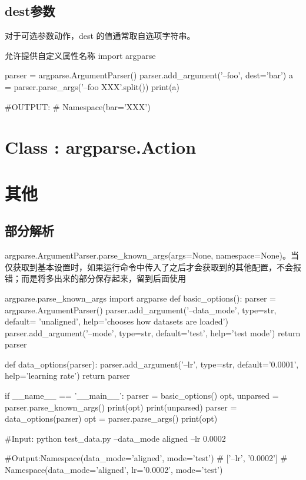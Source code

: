 \documentclass[11pt]{article}
\begin{document}
\subsection{dest参数}
对于可选参数动作，dest 的值通常取自选项字符串。
\begin{Python}{允许提供自定义属性名称}
import argparse

parser = argparse.ArgumentParser()
parser.add_argument('--foo', dest='bar')
a = parser.parse_args('--foo XXX'.split())
print(a)

#OUTPUT:
#       Namespace(bar='XXX')
\end{Python}
\section{Class : argparse.Action}
\section{其他}
\subsection{部分解析}
argparse.ArgumentParser.parse\_known\_args(args=None, namespace=None)。当仅获取到基本设置时，如果运行命令中传入了之后才会获取到的其他配置，不会报错；而是将多出来的部分保存起来，留到后面使用
\begin{Python}{argparse.parse\_known\_args}
import argparse
def basic_options():
parser = argparse.ArgumentParser()
parser.add_argument('--data_mode', type=str, default= 'unaligned', help='chooses how datasets are loaded')
parser.add_argument('--mode', type=str, default='test', help='test mode')
return parser

def data_options(parser):
parser.add_argument('--lr', type=str, default='0.0001', help='learning rate')
return parser

if __name__ == '__main__':
parser = basic_options()
opt, unparsed = parser.parse_known_args()
print(opt)
print(unparsed)
parser = data_options(parser)
opt = parser.parse_args()
print(opt)

#Input: python test_data.py --data_mode aligned --lr 0.0002

#Output:Namespace(data_mode='aligned', mode='test')
#       ['--lr', '0.0002']
#       Namespace(data_mode='aligned', lr='0.0002', mode='test')

\end{Python}
\end{document}
